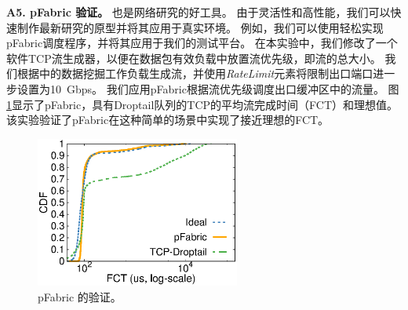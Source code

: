 \textbf {A5. pFabric 验证。}
\name 也是网络研究的好工具。
由于灵活性和高性能，我们可以快速制作最新研究的原型并将其应用于真实环境。
例如，我们可以使用\name 轻松实现pFabric调度程序\cite {pfabric}，并将其应用于我们的测试平台。
在本实验中，我们修改了一个软件TCP流生成器\cite {mqecn}，以便在数据包有效负载中放置流优先级，即流的总大小。
我们根据\cite {pfabric}中的数据挖掘工作负载生成流，并使用\textit {RateLimit}元素将限制出口端口进一步设置为10~Gbps。
我们应用pFabric根据流优先级调度出口缓冲区中的流量。
图 \ref {clicknp:fig:pfabric}显示了pFabric，具有Droptail队列的TCP的平均流完成时间（FCT）和理想值。
该实验验证了pFabric在这种简单的场景中实现了接近理想的FCT。

\begin{figure}[h!]
	\centering
	\includegraphics[width=0.6\textwidth]{eval/pfabric}
	
	\caption{pFabric 的验证。}
	\label{clicknp:fig:pfabric}
	
\end{figure}

